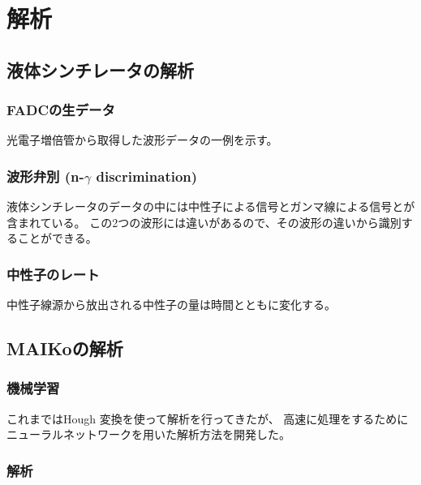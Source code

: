 \chapter{解析}
\section{液体シンチレータの解析}
\subsection{FADCの生データ}
光電子増倍管から取得した波形データの一例を示す。

\subsection{波形弁別 (n-$\gamma$ discrimination)}
液体シンチレータのデータの中には中性子による信号とガンマ線による信号とが含まれている。
この2つの波形には違いがあるので、その波形の違いから識別することができる。

\subsection{中性子のレート}
中性子線源から放出される中性子の量は時間とともに変化する。

\section{MAIKoの解析}
\subsection{機械学習}
これまではHough 変換を使って解析を行ってきたが、
高速に処理をするためにニューラルネットワークを用いた解析方法を開発した。

\subsection{解析}


